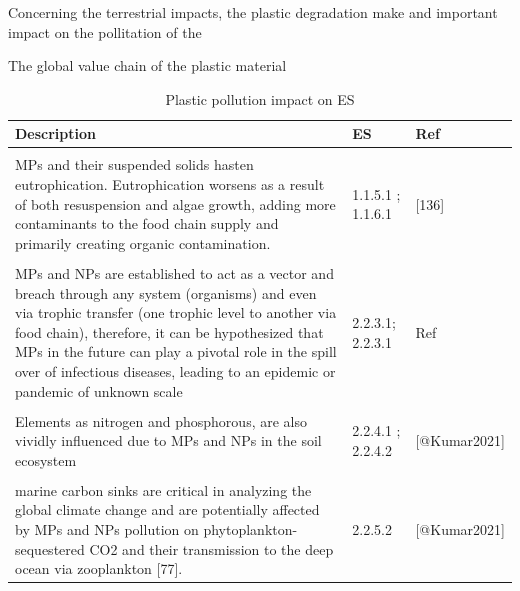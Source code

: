 \documentclass[]{elsarticle} %
\begin{document}
Concerning the terrestrial impacts, the plastic degradation make and important impact on the pollitation of the

The global value chain of the plastic material

\renewcommand{\arraystretch}{1.5}
\begin{table}[!h]

\caption{\label{tab:Value-chain-ES}Plastic pollution impact on ES}
\centering
\begin{tabular}[t]{>{\raggedright\arraybackslash}p{30em}ll}
\toprule
Description & ES & Ref\\
\midrule
\cellcolor{gray!6}{Soil productivity is impacted due to the nutrient imbalance followed by oxidative stress and leading to the poor growth of food crops} & \cellcolor{gray!6}{1.1.1.1 ; 1.2.1.1} & \cellcolor{gray!6}{{}[@Kumar2021]}\\
MPs and their suspended solids hasten eutrophication. Eutrophication worsens as a result of both resuspension and algae growth, adding more contaminants to the food chain supply and primarily creating organic contamination. & 1.1.5.1 ; 1.1.6.1 & {}[136]\\
\cellcolor{gray!6}{MPs and NPs in the atmosphere also lead to the obstruction and lowering of pollination.} & \cellcolor{gray!6}{2.2.2.1} & \cellcolor{gray!6}{{}[@Kumar2021]}\\
MPs and NPs are established to act as a vector and breach through any system (organisms) and even via trophic transfer (one trophic level to another via food chain), therefore, it can be hypothesized that MPs in the future can play a pivotal role in the spill over of infectious diseases, leading to an epidemic or pandemic of unknown scale & 2.2.3.1; 2.2.3.1 & Ref\\
\cellcolor{gray!6}{MP and NP in terrestrial ecosystems reduce tha ability to sequester carbon.} & \cellcolor{gray!6}{2.1.1.2 ; 2.2.4.1} & \cellcolor{gray!6}{{}[@Kumar2021]}\\
\addlinespace
Elements as nitrogen and phosphorous, are also vividly influenced due to MPs and NPs in the soil ecosystem & 2.2.4.1 ; 2.2.4.2 & {}[@Kumar2021]\\
\cellcolor{gray!6}{MPs accumulation can promote mineralization, nitrification, and denitrification in aquatic ecosystems, therefore releasing CO2, CH4, and N2O.} & \cellcolor{gray!6}{2.2.6.1} & \cellcolor{gray!6}{{}[@Kumar2021]}\\
marine carbon sinks are critical in analyzing the global climate change and are potentially affected by MPs and NPs pollution on phytoplankton-sequestered CO2 and their transmission to the deep ocean via zooplankton [77]. & 2.2.5.2 & {}[@Kumar2021]\\

\end{tabular}
\end{table}
\end{document}
